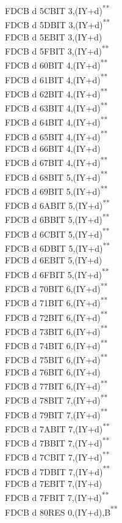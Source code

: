 \documentclass[twoside,openright,a4paper]{book}
\newcommand{\UNDOC}{\textnormal{\textsuperscript{**}}}
\begin{document}
\begin{multicols}{3}
{\begin{tabbing}
	FDCB d 5C\>BIT 3,(IY+d)\UNDOC\\
	FDCB d 5D\>BIT 3,(IY+d)\UNDOC\\
	FDCB d 5E\>BIT 3,(IY+d)\\
	FDCB d 5F\>BIT 3,(IY+d)\UNDOC\\
	FDCB d 60\>BIT 4,(IY+d)\UNDOC\\
	FDCB d 61\>BIT 4,(IY+d)\UNDOC\\
	FDCB d 62\>BIT 4,(IY+d)\UNDOC\\
	FDCB d 63\>BIT 4,(IY+d)\UNDOC\\
	FDCB d 64\>BIT 4,(IY+d)\UNDOC\\
	FDCB d 65\>BIT 4,(IY+d)\UNDOC\\
	FDCB d 66\>BIT 4,(IY+d)\\
	FDCB d 67\>BIT 4,(IY+d)\UNDOC\\
	FDCB d 68\>BIT 5,(IY+d)\UNDOC\\
	FDCB d 69\>BIT 5,(IY+d)\UNDOC\\
	FDCB d 6A\>BIT 5,(IY+d)\UNDOC\\
	FDCB d 6B\>BIT 5,(IY+d)\UNDOC\\
	FDCB d 6C\>BIT 5,(IY+d)\UNDOC\\
	FDCB d 6D\>BIT 5,(IY+d)\UNDOC\\
	FDCB d 6E\>BIT 5,(IY+d)\\
	FDCB d 6F\>BIT 5,(IY+d)\UNDOC\\
	FDCB d 70\>BIT 6,(IY+d)\UNDOC\\
	FDCB d 71\>BIT 6,(IY+d)\UNDOC\\
	FDCB d 72\>BIT 6,(IY+d)\UNDOC\\
	FDCB d 73\>BIT 6,(IY+d)\UNDOC\\
	FDCB d 74\>BIT 6,(IY+d)\UNDOC\\
	FDCB d 75\>BIT 6,(IY+d)\UNDOC\\
	FDCB d 76\>BIT 6,(IY+d)\\
	FDCB d 77\>BIT 6,(IY+d)\UNDOC\\
	FDCB d 78\>BIT 7,(IY+d)\UNDOC\\
	FDCB d 79\>BIT 7,(IY+d)\UNDOC\\
	FDCB d 7A\>BIT 7,(IY+d)\UNDOC\\
	FDCB d 7B\>BIT 7,(IY+d)\UNDOC\\
	FDCB d 7C\>BIT 7,(IY+d)\UNDOC\\
	FDCB d 7D\>BIT 7,(IY+d)\UNDOC\\
	FDCB d 7E\>BIT 7,(IY+d)\\
	FDCB d 7F\>BIT 7,(IY+d)\UNDOC\\
	FDCB d 80\>RES 0,(IY+d),B\UNDOC\\

\end{tabbing}}
\end{multicols}
\end{document}
